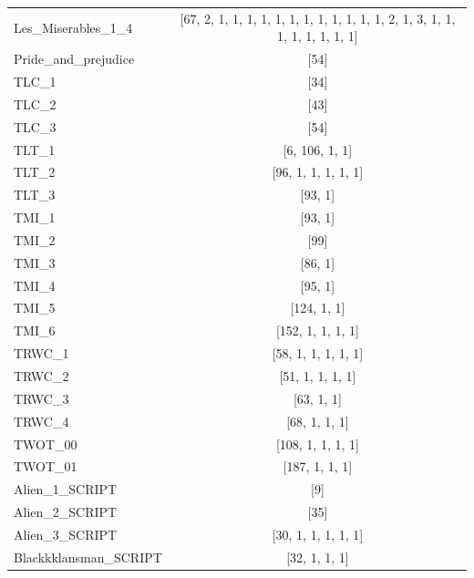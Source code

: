 \documentclass[a4paper, 12pt]{report}
\begin{document}
\begin{table}
{\begin{tabular}{|l|c|}
Les\_Miserables\_1\_4            & {[}67, 2, 1, 1, 1, 1, 1, 1, 1, 1, 1, 1, 1, 1, 2, 1, 3, 1, 1, 1, 1, 1, 1, 1, 1{]} \\
Pride\_and\_prejudice         & {[}54{]}                         \\
TLC\_1                        & {[}34{]}                         \\
TLC\_2                        & {[}43{]}                         \\
TLC\_3                        & {[}54{]}                         \\
TLT\_1                        & {[}6, 106, 1, 1{]}               \\
TLT\_2                        & {[}96, 1, 1, 1, 1, 1{]}          \\
TLT\_3                        & {[}93, 1{]}                      \\
TMI\_1                        & {[}93, 1{]}                      \\
TMI\_2                        & {[}99{]}                         \\
TMI\_3                        & {[}86, 1{]}                      \\
TMI\_4                        & {[}95, 1{]}                      \\
TMI\_5                        & {[}124, 1, 1{]}                  \\
TMI\_6                        & {[}152, 1, 1, 1, 1{]}            \\
TRWC\_1                       & {[}58, 1, 1, 1, 1, 1{]}          \\
TRWC\_2                       & {[}51, 1, 1, 1, 1{]}             \\
TRWC\_3                       & {[}63, 1, 1{]}                   \\
TRWC\_4                       & {[}68, 1, 1, 1{]}                \\
TWOT\_00                      & {[}108, 1, 1, 1, 1{]}            \\
TWOT\_01                      & {[}187, 1, 1, 1{]}               \\
Alien\_1\_SCRIPT              & {[}9{]}                          \\
Alien\_2\_SCRIPT              & {[}35{]}                         \\
Alien\_3\_SCRIPT              & {[}30, 1, 1, 1, 1, 1{]}          \\
Blackkklansman\_SCRIPT        & {[}32, 1, 1, 1{]}                \\

\end{tabular}}
\end{table}
\end{document}
